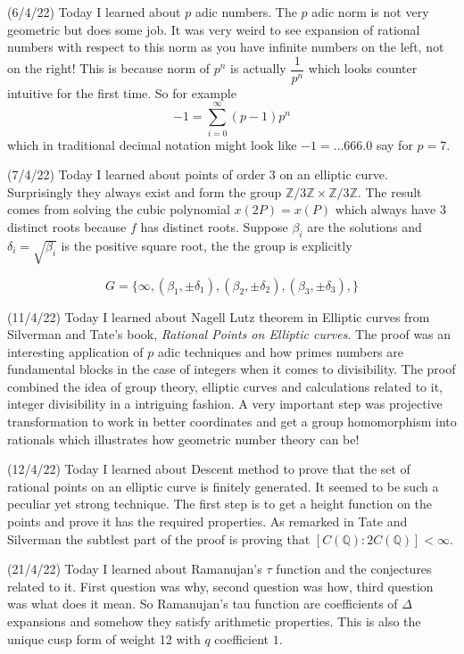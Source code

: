 \documentclass[12pt,a4paper]{article}
\newcommand{\Z}{\mathbb{Z}}
\newcommand{\Q}{\mathbb{Q}}
\begin{document}
   (6/4/22) Today I learned about $p$ adic numbers. The $p$ adic norm is not very geometric but does some job. It was very weird to see expansion of rational numbers with respect to this norm as you have infinite numbers on the left, not on the right! This is because norm of $p^n$ is actually $\dfrac{1}{p^n}$ which looks counter intuitive for the first time. So for example 
   \[ -1 = \sum_{i = 0}^{\infty} (p-1)p^n\]
   which in traditional decimal notation might look like $-1 = \ldots 666.0$ say for $p = 7$.
   
   (7/4/22) Today I learned about points of order 3 on an elliptic curve. Surprisingly they always exist and form the group $\Z / 3\Z \times \Z /3\Z$. The result comes from solving the cubic polynomial $x(2P) = x(P)$ which always have 3 distinct roots because $f$ has distinct roots. Suppose $\beta_i$ are the solutions and $\delta_i = \sqrt{\beta_i}$ is the positive square root, the the group is explicitly
   
   \[ G  =\{\infty, (\beta_1,\pm \delta_1),(\beta_2,\pm \delta_2),(\beta_3,\pm \delta_3),\} \]
   
   (11/4/22) Today I learned about Nagell Lutz theorem in Elliptic curves from Silverman and Tate's book, \textit{Rational Points on Elliptic curves}. The proof was an interesting application of $p$ adic techniques and how primes numbers are fundamental blocks in the case of integers when it comes to divisibility. The proof combined the idea of group theory, elliptic curves and calculations related to it, integer divisibility in a intriguing fashion. A very important step was projective transformation to work in better coordinates and get a group homomorphism into rationals which illustrates how geometric number theory can be! 
   
   (12/4/22) Today I learned about Descent method to prove that the set of rational points on an elliptic curve is finitely generated. It seemed to be such a peculiar yet strong technique. The first step is to get a height function on the points and prove it has the required properties. As remarked in Tate and Silverman the subtlest part of the proof is proving that $[C(\Q): 2C(\Q)] < \infty $.
	
	(21/4/22) Today I learned about Ramanujan's $\tau$ function and the conjectures related to it. First question was why, second question was how, third question was what does it mean. So Ramanujan's tau function are coefficients of $\Delta$ expansions and somehow they satisfy arithmetic properties. This is also the unique cusp form of weight 12 with $q$ coefficient $1$.
	
\end{document}
